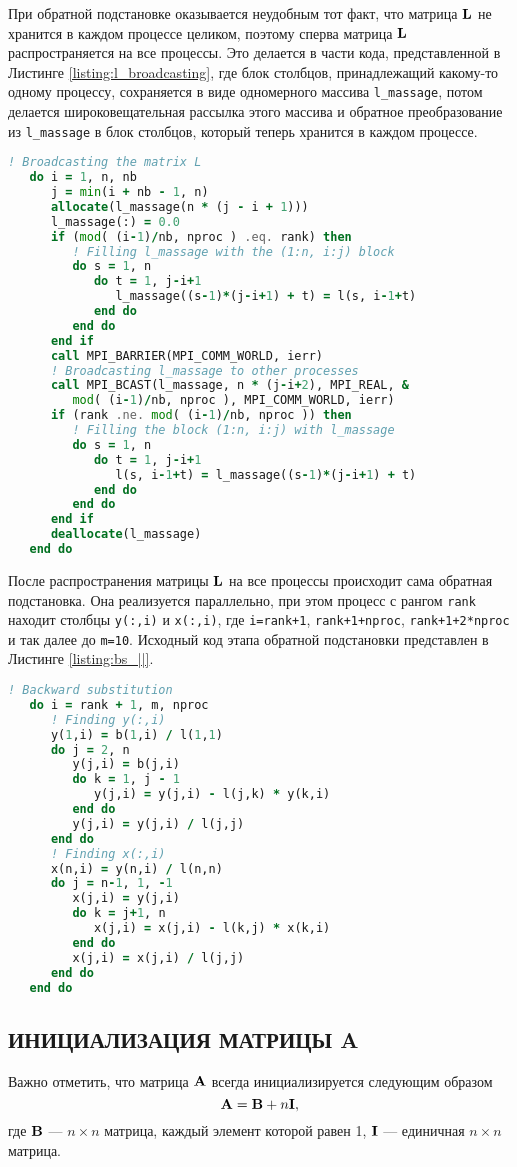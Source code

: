 При обратной подстановке оказывается неудобным тот факт, что матрица $\vb{L}$ не хранится в каждом процессе целиком, поэтому сперва матрица $\vb{L}$ распространяется на все процессы. Это делается в части кода, представленной в Листинге \ref{listing:l_broadcasting}, где блок столбцов, принадлежащий какому-то одному процессу, сохраняется в виде одномерного массива \texttt{l\_massage}, потом делается широковещательная рассылка этого массива и обратное преобразование из \texttt{l\_massage} в блок столбцов, который теперь хранится в каждом процессе.
\begin{lstlisting}[language=fortran, style=fortran, label={listing:l_broadcasting}, caption={Распространение фактора Холецкого $\vb{L}$ на все процессы.}]
   ! Broadcasting the matrix L
   do i = 1, n, nb
      j = min(i + nb - 1, n)
      allocate(l_massage(n * (j - i + 1)))
      l_massage(:) = 0.0
      if (mod( (i-1)/nb, nproc ) .eq. rank) then
         ! Filling l_massage with the (1:n, i:j) block
         do s = 1, n
            do t = 1, j-i+1
               l_massage((s-1)*(j-i+1) + t) = l(s, i-1+t)
            end do
         end do
      end if
      call MPI_BARRIER(MPI_COMM_WORLD, ierr)
      ! Broadcasting l_massage to other processes
      call MPI_BCAST(l_massage, n * (j-i+2), MPI_REAL, &
         mod( (i-1)/nb, nproc ), MPI_COMM_WORLD, ierr)
      if (rank .ne. mod( (i-1)/nb, nproc )) then
         ! Filling the block (1:n, i:j) with l_massage
         do s = 1, n
            do t = 1, j-i+1
               l(s, i-1+t) = l_massage((s-1)*(j-i+1) + t)
            end do
         end do
      end if
      deallocate(l_massage)
   end do
\end{lstlisting}

После распространения матрицы $\vb{L}$ на все процессы происходит сама обратная подстановка. Она реализуется параллельно, при этом процесс с рангом \texttt{rank} находит столбцы \texttt{y(:,i)} и \texttt{x(:,i)}, где \texttt{i=rank+1}, \texttt{rank+1+nproc}, \texttt{rank+1+2*nproc} и так далее до \texttt{m=10}. Исходный код этапа обратной подстановки представлен в Листинге \ref{listing:bs_||}.
\begin{lstlisting}[language=fortran, style=fortran, label={listing:bs_||}, caption={Исходный код этапа обратной подстановки в оптимизированной с помощью MPI версии алгоритма.}]
   ! Backward substitution
   do i = rank + 1, m, nproc
      ! Finding y(:,i)
      y(1,i) = b(1,i) / l(1,1)
      do j = 2, n
         y(j,i) = b(j,i)
         do k = 1, j - 1
            y(j,i) = y(j,i) - l(j,k) * y(k,i)
         end do
         y(j,i) = y(j,i) / l(j,j)
      end do
      ! Finding x(:,i)
      x(n,i) = y(n,i) / l(n,n)
      do j = n-1, 1, -1
         x(j,i) = y(j,i)
         do k = j+1, n
            x(j,i) = x(j,i) - l(k,j) * x(k,i)
         end do
         x(j,i) = x(j,i) / l(j,j)
      end do 
   end do
\end{lstlisting}

\subsection{ИНИЦИАЛИЗАЦИЯ МАТРИЦЫ A}

Важно отметить, что матрица $\vb{A}$ всегда инициализируется следующим образом
\begin{equation}
    \vb{A} = \vb{B} + n \vb{I},
\end{equation}
где $\vb{B}$ --- $n\times n$ матрица, каждый элемент которой равен 1, $\vb{I}$ --- единичная $n\times n$ матрица.
